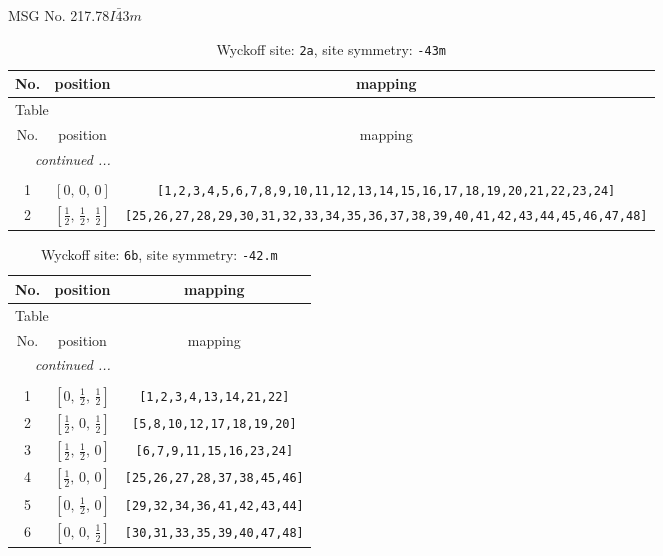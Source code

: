 \documentclass[fleqn,8pt]{jsarticle}
\begin{document}
\setcounter{MaxMatrixCols}{32}

\renewcommand{\tablename}{Table~}
\renewcommand{\figurename}{Figure~}
\begin{center}
\LARGE
MSG No. 217.78\quad$I\bar{4}3m$
\end{center}
\renewcommand{\arraystretch}{1.2}
\begin{longtable}{ccc}
\caption{Wyckoff site: {\tt 2a}, site symmetry: {\tt -43m}}
 \\
 \hline \hline
No. & position & mapping \\ \hline \endfirsthead

\multicolumn{2}{l}{\tablename\ \thetable{}} \\
 \hline \hline
No. & position & mapping \\ \hline \endhead

 \hline \hline
\multicolumn{2}{r}{\footnotesize\it continued ...} \\ \endfoot

 \hline \hline
\multicolumn{2}{r}{} \\ \endlastfoot

1 & $\left[ 0,\, 0,\, 0 \right]$ & {\tt [1,2,3,4,5,6,7,8,9,10,11,12,13,14,15,16,17,18,19,20,21,22,23,24]} \\ \hline
2 & $\left[ \frac{1}{2},\, \frac{1}{2},\, \frac{1}{2} \right]$ & {\tt [25,26,27,28,29,30,31,32,33,34,35,36,37,38,39,40,41,42,43,44,45,46,47,48]} \\
\end{longtable}
\renewcommand{\arraystretch}{1.2}
\begin{longtable}{ccc}
\caption{Wyckoff site: {\tt 6b}, site symmetry: {\tt -42.m}}
 \\
 \hline \hline
No. & position & mapping \\ \hline \endfirsthead

\multicolumn{2}{l}{\tablename\ \thetable{}} \\
 \hline \hline
No. & position & mapping \\ \hline \endhead

 \hline \hline
\multicolumn{2}{r}{\footnotesize\it continued ...} \\ \endfoot

 \hline \hline
\multicolumn{2}{r}{} \\ \endlastfoot

1 & $\left[ 0,\, \frac{1}{2},\, \frac{1}{2} \right]$ & {\tt [1,2,3,4,13,14,21,22]} \\ \hline
2 & $\left[ \frac{1}{2},\, 0,\, \frac{1}{2} \right]$ & {\tt [5,8,10,12,17,18,19,20]} \\ \hline
3 & $\left[ \frac{1}{2},\, \frac{1}{2},\, 0 \right]$ & {\tt [6,7,9,11,15,16,23,24]} \\ \hline
4 & $\left[ \frac{1}{2},\, 0,\, 0 \right]$ & {\tt [25,26,27,28,37,38,45,46]} \\ \hline
5 & $\left[ 0,\, \frac{1}{2},\, 0 \right]$ & {\tt [29,32,34,36,41,42,43,44]} \\ \hline
6 & $\left[ 0,\, 0,\, \frac{1}{2} \right]$ & {\tt [30,31,33,35,39,40,47,48]} \\
\end{longtable}
\end{document}
